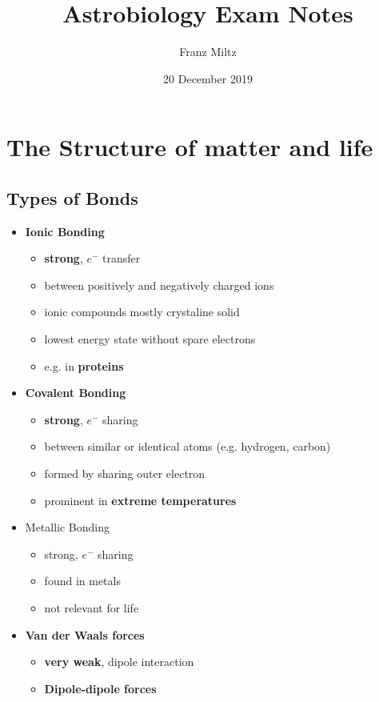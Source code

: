 \documentclass{article}
\title{Astrobiology Exam Notes}
\date{20 December 2019}
\author{Franz Miltz}
\theoremstyle{sltheorem}
\begin{document}
\maketitle
\tableofcontents
\pagebreak
\section{The Structure of matter and life}
\subsection{Types of Bonds}
\begin{itemize}
    \item \textbf{Ionic Bonding}
    \begin{itemize}
        \item \textbf{strong}, $e^-$ transfer
        \item between positively and negatively charged ions
        \item ionic compounds mostly crystaline solid
        \item lowest energy state without spare electrons
        \item e.g. in \textbf{proteins}
    \end{itemize}
    \item \textbf{Covalent Bonding}
    \begin{itemize}
        \item \textbf{strong}, $e^-$ sharing
        \item between similar or identical atoms (e.g. hydrogen, carbon)
        \item formed by sharing outer electron
        \item prominent in \textbf{extreme temperatures}
    \end{itemize}
    \item Metallic Bonding
    \begin{itemize}
        \item strong, $e^-$ sharing
        \item found in metals
        \item not relevant for life
    \end{itemize}
    \item \textbf{Van der Waals forces}
    \begin{itemize}
        \item \textbf{very weak}, dipole interaction
        \item \textbf{Dipole-dipole forces}
        \begin{itemize}

\end{itemize}
\end{itemize}
\end{itemize}
\end{document}
